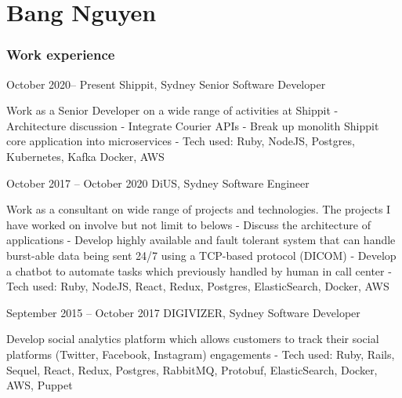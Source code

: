 \documentclass{tccv}
\begin{document}
\part{Bang Nguyen}

\section{Work experience}

\begin{eventlist}

\item{October 2020-- Present}
    {Shippit, Sydney}
    {Senior Software Developer}

    Work as a Senior Developer on a wide range of activities at Shippit
    \newline- Architecture discussion
    \newline- Integrate Courier APIs
    \newline- Break up monolith Shippit core application into microservices
    \newline- Tech used: Ruby, NodeJS, Postgres, Kubernetes, Kafka
    Docker, AWS

\item{October 2017 -- October 2020}
    {DiUS, Sydney}
    {Software Engineer}

    Work as a consultant on wide range of projects and technologies. The projects
    I have worked on involve but not limit to belows
    \newline- Discuss the architecture of applications
    \newline- Develop highly available and fault tolerant system that can handle
    burst-able data being sent 24/7 using a TCP-based protocol (DICOM)
    \newline- Develop a chatbot to automate tasks which previously handled by
    human in call center
    \newline- Tech used: Ruby, NodeJS, React, Redux, Postgres, ElasticSearch,
    Docker, AWS

\item{September 2015 -- October 2017}
    {DIGIVIZER, Sydney}
    {Software Developer}

    Develop social analytics platform which allows customers to track their
    social platforms (Twitter, Facebook, Instagram) engagements
    \newline- Tech used: Ruby, Rails, Sequel, React, Redux, Postgres, RabbitMQ,
    Protobuf, ElasticSearch, Docker, AWS, Puppet


\end{eventlist}
\end{document}
